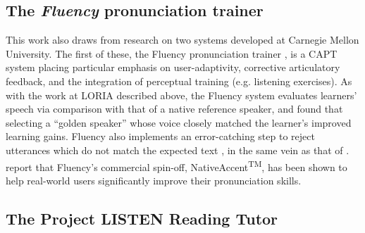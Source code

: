 
	\subsection{The \textit{Fluency} pronunciation trainer}
	\label{sec:capt:fluency}
	
	This work also draws from research on two systems developed at Carnegie Mellon University.
%
	The first of these, the Fluency pronunciation trainer \citep{Eskenazi1998,Eskenazi2000}, is a CAPT system placing particular emphasis on
user-adaptivity, corrective articulatory feedback, and the integration of perceptual training (e.g. listening exercises). As with the work at LORIA described above, the Fluency system evaluates learners' speech via comparison with that of a native reference speaker, and \textcite{Probst2002} found that selecting a ``golden speaker'' whose voice closely matched the learner's improved learning gains. 
Fluency also implements an error-catching step to reject utterances which do not match the expected text \citep{Eskenazi2000}, in the same vein as that of \textcite{Mesbahi2011,Orosanu2012}. \textcite{Eskenazi2007} report that Fluency's commercial spin-off, NativeAccent\textsuperscript{TM}, has been shown to help real-world users significantly improve their pronunciation skills.
	
	\subsection{The Project LISTEN Reading Tutor}
	\label{sec:capt:listen}
	
